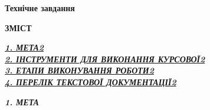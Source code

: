 \documentclass[a4paper,12pt]{article}
\renewcommand{\dstuMainSubtitle}{Технічне завдання}
\begin{document}
  \newpage


  \renewcommand{\dstuMainSubtitle}{Опис альбому}
  \renewcommand{\dstuDocCode}{КПІ.ФІОТ.IO4106.001 ОА}
  
  \dstuPageMain
  \dstuTopTable
  \renewcommand{\dstuSheetCount}{1}

  \newpage

  \dstuPagePlain


  \vspace*{0.45\textheight} %
  \begin{center}
  \textbf{{\fontsize{50pt}{3pt}\selectfont Технічне завдання}}
  \end{center}
  \vspace*{\fill}

  \newpage

  \dstuPageMain


  \renewcommand{\dstuMainSubtitle}{Технічне завдання}
  \renewcommand{\dstuDocCode}{КПІ.ФІОТ.IO4106.002 ТЗ}

  \begin{center}
    \textbf{\Large ЗМІСТ}
  \end{center}

  \hyperref[sec:meta]{\textbf{\textit{1. МЕТА\makebox[13cm][l]{\dotfill}2}}}\\[1em]

  \hyperref[sec:tools]{\textbf{\textit{2. ІНСТРУМЕНТИ ДЛЯ ВИКОНАННЯ КУРСОВОЇ\makebox[3.2cm][l]{\dotfill}2}}}\\[1em]

  \hyperref[sec:stages]{\textbf{\textit{3. ЕТАПИ ВИКОНУВАННЯ РОБОТИ\makebox[6.35cm][l]{\dotfill}2}}}\\[1em]

  \hyperref[sec:docs]{\textbf{\textit{4. ПЕРЕЛІК ТЕКСТОВОЇ ДОКУМЕНТАЦІЇ\makebox[4.9cm][l]{\dotfill}2}}}\\[1em]

  \renewcommand{\dstuSheetCount}{2}

  \newpage

  \dstuPageFull

  \begin{center}
    \label{sec:meta}%
    \textbf{\textit{1. МЕТА}}
  \end{center}
\end{document}
